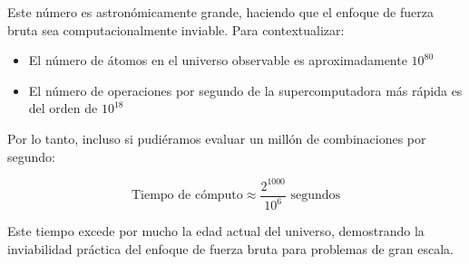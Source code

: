 \documentclass[9pt,a4paper,twoside]{rho-class/rho}
\begin{document}
            Este número es astronómicamente grande, haciendo que el enfoque de fuerza bruta sea computacionalmente inviable. Para contextualizar:

            \begin{itemize}
                \item El número de átomos en el universo observable es aproximadamente $10^{80}$
                \item El número de operaciones por segundo de la supercomputadora más rápida es del orden de $10^{18}$
            \end{itemize}

            Por lo tanto, incluso si pudiéramos evaluar un millón de combinaciones por segundo:

            \begin{equation}
                \text{Tiempo de cómputo} \approx \frac{2^{1000}}{10^6} \text{ segundos}
            \end{equation}

            Este tiempo excede por mucho la edad actual del universo, demostrando la inviabilidad práctica del enfoque de fuerza bruta para problemas de gran escala.
                
\end{document}
